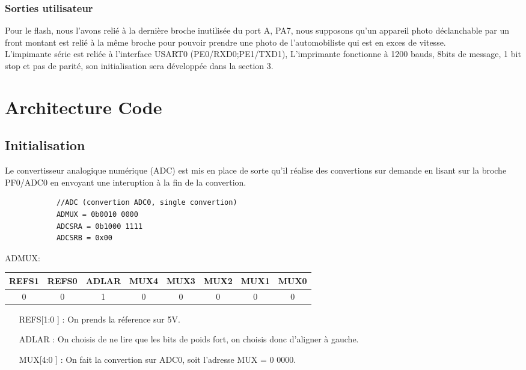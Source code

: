 \documentclass[a4paper, 12pt]{article}
\begin{document}
		\subsubsection{Sorties utilisateur}
		Pour le flash, nous l'avons relié à la dernière broche inutilisée du port A, PA7, nous supposons qu'un appareil photo déclanchable par un front montant est relié à la même broche pour pouvoir prendre une photo de l'automobiliste qui est en exces de vitesse.\\
		L'impimante série est reliée à l'interface USART0 (PE0/RXD0;PE1/TXD1), L'imprimante fonctionne à 1200 bauds, 8bits de message, 1 bit stop et pas de parité, son initialisation sera développée dans la section 3.\\
	\newpage
	\section{Architecture Code}
		\subsection{Initialisation}
		Le convertisseur analogique numérique (ADC) est mis en place de sorte qu'il réalise des convertions sur demande en lisant sur la broche PF0/ADC0 en envoyant une interuption à la fin de la convertion.
		\begin{lstlisting}
			//ADC (convertion ADC0, single convertion)
			ADMUX = 0b0010 0000
			ADCSRA = 0b1000 1111
			ADCSRB = 0x00
		\end{lstlisting}
		
		ADMUX:
		\begin{center}
		\begin{tabular}{|c|c|c|c|c|c|c|c|}
		\hline
		REFS1 & REFS0 & ADLAR & MUX4 & MUX3 & MUX2 & MUX1 & MUX0\\
		\hline
		0 & 0 & 1 & 0 & 0 & 0 & 0 & 0\\
		\hline
		\end{tabular}
		\end{center}
		\begin{itemize}
			\item[REFS[1:0]] : On prends la réference sur 5V.
			\item[ADLAR] : On choisis de ne lire que les bits de poids fort, on choisis donc d'aligner à gauche.
			\item[MUX[4:0]] : On fait la convertion sur ADC0, soit l'adresse MUX = 0 0000.
		\end{itemize}
		
\end{document}
